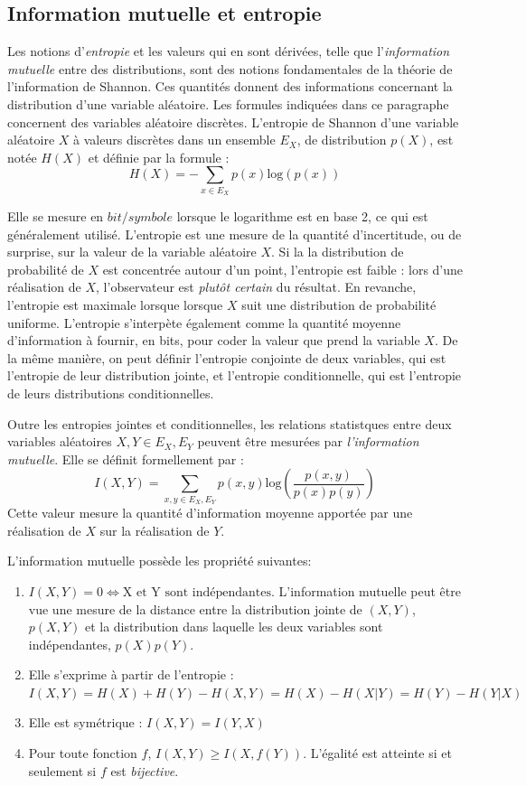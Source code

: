 \subsection{Information mutuelle et entropie}

Les notions d'\emph{entropie} et les valeurs qui en sont dérivées, telle que l'\emph{information mutuelle} entre des distributions, sont des notions fondamentales de la théorie de l'information de Shannon. Ces quantités donnent des informations concernant la distribution d'une variable aléatoire.
Les formules indiquées dans ce paragraphe concernent des variables aléatoire discrètes. 
L'entropie de Shannon d'une variable aléatoire $X$ à valeurs discrètes dans un ensemble $E_X$, de distribution $p(X)$, est notée $H(X)$ et définie par la formule : 
\begin{equation}
H(X) = - \sum_{x \in E_X}{p(x)\textrm{log}(p(x))}
\end{equation}

Elle se mesure en $bit/symbole$ lorsque le logarithme est en base 2, ce qui est généralement utilisé. 
L'entropie est une mesure de la quantité d'incertitude, ou de surprise, sur la valeur de la variable aléatoire $X$. Si la la distribution de probabilité de $X$ est concentrée autour d'un point, l'entropie est faible : lors d'une réalisation de $X$, l'observateur est \emph{plutôt certain} du résultat. En revanche, l'entropie est maximale lorsque lorsque $X$ suit une distribution de probabilité uniforme.
L'entropie s'interpète également comme la quantité moyenne d'information à fournir, en bits, pour coder la valeur que prend la variable $X$.
De la même manière, on peut définir l'entropie conjointe de deux variables, qui est l'entropie de leur distribution jointe, et l'entropie conditionnelle, qui est l'entropie de leurs distributions conditionnelles.

Outre les entropies jointes et conditionnelles, les relations statistques entre deux variables aléatoires $X,Y \in E_X,E_Y$ peuvent être mesurées par \emph{l'information mutuelle}. Elle se définit formellement par : 
\begin{equation}
 I(X,Y) = \sum_{x,y \in E_X,E_Y}{p(x,y)\textrm{log}(\frac{p(x,y)}{p(x)p(y)})}
\end{equation}
Cette valeur mesure la quantité d'information moyenne apportée par une réalisation de $X$ sur la réalisation de $Y$.

L'information mutuelle possède les propriété suivantes:
\begin{enumerate}
\item $I(X,Y) = 0 \Leftrightarrow \textrm{X et Y sont indépendantes}$. L'information mutuelle peut être vue une mesure de la distance entre la distribution jointe de $(X,Y)$, $p(X,Y)$ et la distribution dans laquelle les deux variables sont indépendantes, $p(X)p(Y)$.
\item Elle s'exprime à partir de l'entropie : $I(X,Y) = H(X) + H(Y) - H(X,Y) = H(X) - H(X|Y) = H(Y) - H(Y|X)$
\item Elle est symétrique : $I(X,Y) = I(Y,X)$
\item Pour toute fonction $f$, $I(X,Y) \geq I(X,f(Y))$. L'égalité est atteinte si et seulement si $f$ est \emph{bijective}.
\end{enumerate}


